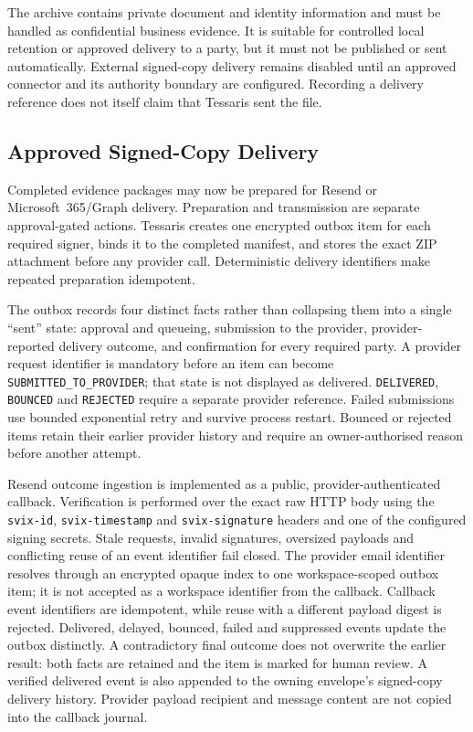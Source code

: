 The archive contains private document and identity information and must be
handled as confidential business evidence.  It is suitable for controlled local
retention or approved delivery to a party, but it must not be published or sent
automatically.  External signed-copy delivery remains disabled until an approved
connector and its authority boundary are configured.  Recording a delivery
reference does not itself claim that Tessaris sent the file.

\subsection{Approved Signed-Copy Delivery}

Completed evidence packages may now be prepared for Resend or
Microsoft~365/Graph delivery.  Preparation and transmission are separate
approval-gated actions.  Tessaris creates one encrypted outbox item for each
required signer, binds it to the completed manifest, and stores the exact ZIP
attachment before any provider call.  Deterministic delivery identifiers make
repeated preparation idempotent.

The outbox records four distinct facts rather than collapsing them into a
single ``sent'' state: approval and queueing, submission to the provider,
provider-reported delivery outcome, and confirmation for every required party.
A provider request identifier is mandatory before an item can become
\texttt{SUBMITTED\_TO\_PROVIDER}; that state is not displayed as delivered.
\texttt{DELIVERED}, \texttt{BOUNCED} and \texttt{REJECTED} require a separate
provider reference.  Failed submissions use bounded exponential retry and
survive process restart.  Bounced or rejected items retain their earlier
provider history and require an owner-authorised reason before another attempt.

Resend outcome ingestion is implemented as a public, provider-authenticated
callback.  Verification is performed over the exact raw HTTP body using the
\texttt{svix-id}, \texttt{svix-timestamp} and \texttt{svix-signature} headers and
one of the configured signing secrets.  Stale requests, invalid signatures,
oversized payloads and conflicting reuse of an event identifier fail closed.
The provider email identifier resolves through an encrypted opaque index to one
workspace-scoped outbox item; it is not accepted as a workspace identifier from
the callback.  Callback event identifiers are idempotent, while reuse with a
different payload digest is rejected.  Delivered, delayed, bounced, failed and
suppressed events update the outbox distinctly.  A contradictory final outcome
does not overwrite the earlier result: both facts are retained and the item is
marked for human review.  A verified delivered event is also appended to the
owning envelope's signed-copy delivery history.  Provider payload recipient and
message content are not copied into the callback journal.

